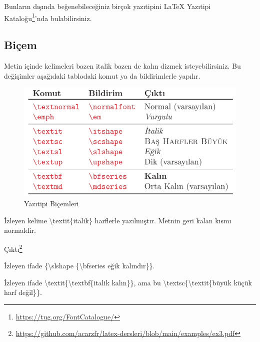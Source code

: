 \documentclass[
  10pt,
]{scrbook}
\newenvironment{Shaded}{\begin{snugshade}}{\end{snugshade}}
\newcommand{\NormalTok}[1]{#1}
\renewcommand{\href}[2]{#2\footnote{\url{#1}}}
\begin{document}
Bunların dışında beğenebileceğiniz birçok yazıtipini \href{https://tug.org/FontCatalogue/}{LaTeX
Yazıtipi
Kataloğu}'nda bulabilirsiniz.

\hypertarget{biuxe7em}{%
\subsection{Biçem}\label{biuxe7em}}

Metin içinde kelimeleri bazen italik bazen de kalın dizmek
isteyebilirsiniz. Bu değişimler aşağıdaki tablodaki komut ya da
bildirimlerle yapılır.

\begin{figure}
\centering
\includegraphics{images/yazitipi7.png}
\caption{Yazıtipi
Biçemleri}
\end{figure}

\begin{Shaded}
\begin{Highlighting}[]
\NormalTok{İzleyen kelime \textbackslash{}textit\{italik\} }
\NormalTok{harflerle yazılmıştır.}
\NormalTok{Metnin geri kalan kısmı}
\NormalTok{normaldir.}
\end{Highlighting}
\end{Shaded}

\href{https://github.com/acarzfr/latex-dersleri/blob/main/examples/ex3.pdf}{Çıktı}

\begin{Shaded}
\begin{Highlighting}[]
\NormalTok{İzleyen ifade \{\textbackslash{}slshape \{\textbackslash{}bfseries eğik kalındır\}\}.}
\end{Highlighting}
\end{Shaded}

\begin{Shaded}
\begin{Highlighting}[]
\NormalTok{İzleyen ifade \textbackslash{}textit\{\textbackslash{}textbf\{italik kalın\}\}, ama bu}
\NormalTok{\textbackslash{}textsc\{\textbackslash{}textit\{büyük küçük harf değil\}\}.}
\end{Highlighting}
\end{Shaded}
\end{document}
